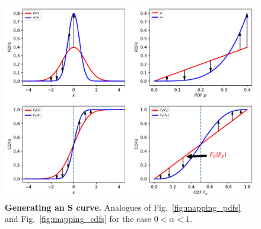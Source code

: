 \documentclass[a4paper, 12pt]{article}
\newcommand{\fref}[1]{Fig.~\ref{fig:#1}}
\newcommand{\vs}{\textit{vs.}\xspace}
\newcommand{\ND}{\mathcal{N}} %
\begin{document}
\begin{figure}[!htb]
\centering
\includegraphics[width=\textwidth]{./figs/mapping_pdfs_cdfs_Sshape.pdf}
\caption{
\textbf{Generating an S curve.} Analogues of \fref{mapping_pdfs} and \fref{mapping_cdfs} for the case $0<\alpha<1$.
}
\end{figure}
\end{document}
